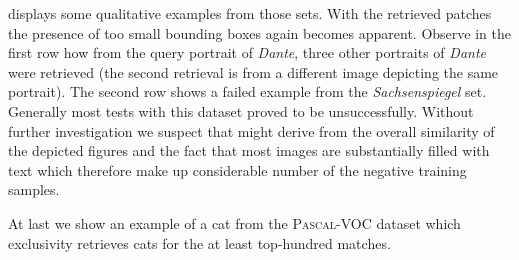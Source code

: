  displays some qualitative examples from those sets. With the retrieved patches the presence of too small bounding boxes  again becomes apparent. Observe in the first row how from the query portrait of \textit{Dante}, three other portraits of \textit{Dante} were retrieved (the second retrieval is from a different image depicting the same portrait). The second row shows a failed example from the \textit{Sachsenspiegel} set. Generally most tests with this dataset proved to be unsuccessfully. Without further investigation we suspect that might derive from the overall similarity of the depicted figures and the fact that most images are substantially filled with text which therefore  make up considerable number of the negative training samples.

At last we show an example of a cat from the \textsc{Pascal}-VOC dataset which exclusivity retrieves cats for the at least top-hundred matches.
